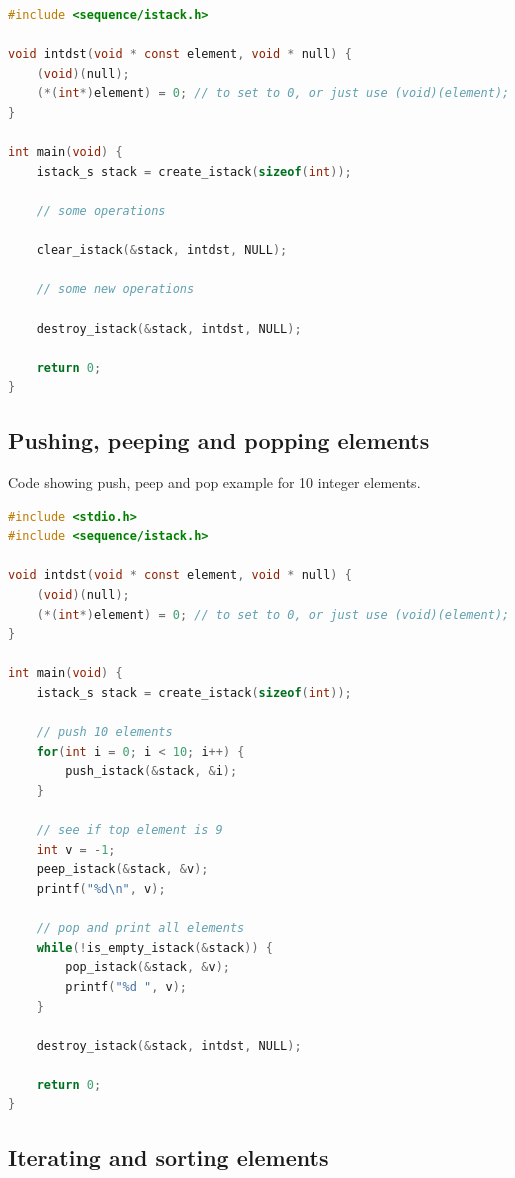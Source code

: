 \begin{lstlisting}[language=C, style=CodeEditor, label=lst:each-stack-01]
#include <sequence/istack.h>

void intdst(void * const element, void * null) {
    (void)(null);
    (*(int*)element) = 0; // to set to 0, or just use (void)(element);
}

int main(void) {
    istack_s stack = create_istack(sizeof(int));

    // some operations

    clear_istack(&stack, intdst, NULL);

    // some new operations

    destroy_istack(&stack, intdst, NULL);

    return 0;
}
\end{lstlisting}

\subsection{Pushing, peeping and popping elements}

Code showing push, peep and pop example for 10 integer elements.

\begin{lstlisting}[language=C, style=CodeEditor, label=lst:each-stack-01]
#include <stdio.h>
#include <sequence/istack.h>

void intdst(void * const element, void * null) {
    (void)(null);
    (*(int*)element) = 0; // to set to 0, or just use (void)(element);
}

int main(void) {
    istack_s stack = create_istack(sizeof(int));

    // push 10 elements
    for(int i = 0; i < 10; i++) {
        push_istack(&stack, &i);
    }

    // see if top element is 9
    int v = -1;
    peep_istack(&stack, &v);
    printf("%d\n", v);

    // pop and print all elements
    while(!is_empty_istack(&stack)) {
        pop_istack(&stack, &v);
        printf("%d ", v);
    }

    destroy_istack(&stack, intdst, NULL);

    return 0;
}
\end{lstlisting}

\subsection{Iterating and sorting elements}

